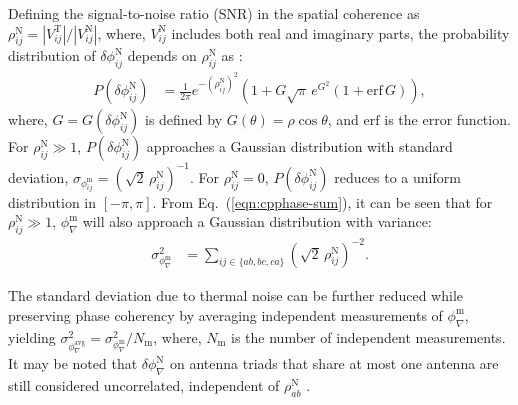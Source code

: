 \documentclass[
reprint,
superscriptaddress,
amsmath,
amssymb,
aps,
prd
]{revtex4-1}
\begin{document}
Defining the signal-to-noise ratio (SNR) in the spatial coherence as $\rho_{ij}^\textrm{N} = |V_{ij}^\textrm{T}|/|V_{ij}^\textrm{N}|$, where, $V_{ij}^\textrm{N}$ includes both real and imaginary parts, the probability distribution of $\delta\phi_{ij}^\textrm{N}$ depends on $\rho_{ij}^\textrm{N}$ as \cite{cra89}:
\begin{align}
  P(\delta\phi_{ij}^\textrm{N}) &= \frac{1}{2\pi} e^{-(\rho_{ij}^\textrm{N})^2} \left(1 + G\sqrt{\pi}\,e^{G^2}(1+\mathrm{erf}\,G)\right),
\end{align}
where, $G=G(\delta\phi_{ij}^\textrm{N})$ is defined by $G(\theta)=\rho\cos\theta$, and $\mathrm{erf}$ is the error function. For $\rho_{ij}^\textrm{N}\gg 1$, $P(\delta\phi_{ij}^\textrm{N})$ approaches a Gaussian distribution with standard deviation, $\sigma_{\phi_{ij}^\textrm{m}} = (\sqrt{2}\,\rho_{ij}^\textrm{N})^{-1}$.
For $\rho_{ij}^\textrm{N}=0$, $P(\delta\phi_{ij}^\textrm{N})$ reduces to a uniform distribution in $[-\pi,\pi]$. From Eq.~(\ref{eqn:cpphase-sum}), it can be seen that for $\rho_{ij}^\textrm{N}\gg 1$, $\phi_\nabla^\textrm{m}$ will also approach a Gaussian distribution with variance:
\begin{align}
  \sigma_{\phi_\nabla^\textrm{m}}^2 &= \sum_{ij\in{\{ab,bc,ca\}}}(\sqrt{2}\,\rho_{ij}^\textrm{N})^{-2}. \label{eqn:cprms-noise}
\end{align}


The standard deviation due to thermal noise can be further reduced while preserving phase coherency by averaging independent measurements of $\phi_\nabla^\textrm{m}$, yielding $\sigma_{\phi_\nabla^\textrm{avg}}^2 = \sigma_{\phi_\nabla^\textrm{m}}^2 / N_\textrm{m}$,
where, $N_\textrm{m}$ is the number of independent measurements. It may be noted that $\delta\phi_\nabla^\textrm{N}$ on antenna triads that share at most one antenna are still considered uncorrelated, independent of $\rho_{ab}^\textrm{N}$ \cite{kul89}.
\end{document}
